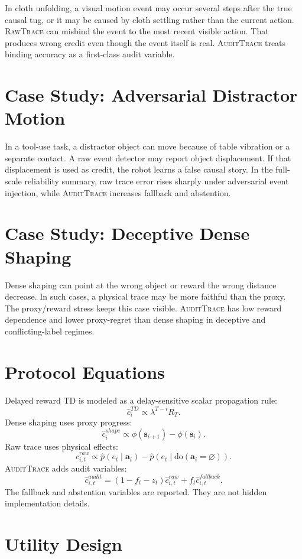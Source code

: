 \documentclass{article}
\newcommand{\method}{\textsc{AuditTrace}\xspace}
\newcommand{\rawtrace}{\textsc{RawTrace}\xspace}
\newcommand{\states}{\mathbf{s}}
\newcommand{\actions}{\mathbf{a}}
\begin{document}
In cloth unfolding, a visual motion event may occur several steps after the true causal tug, or it may be caused by cloth settling rather than the current action. \rawtrace can misbind the event to the most recent visible action. That produces wrong credit even though the event itself is real. \method treats binding accuracy as a first-class audit variable.

\section{Case Study: Adversarial Distractor Motion}

In a tool-use task, a distractor object can move because of table vibration or a separate contact. A raw event detector may report object displacement. If that displacement is used as credit, the robot learns a false causal story. In the full-scale reliability summary, raw trace error rises sharply under adversarial event injection, while \method increases fallback and abstention.

\section{Case Study: Deceptive Dense Shaping}

Dense shaping can point at the wrong object or reward the wrong distance decrease. In such cases, a physical trace may be more faithful than the proxy. The proxy/reward stress keeps this case visible. \method has low reward dependence and lower proxy-regret than dense shaping in deceptive and conflicting-label regimes.

\section{Protocol Equations}

Delayed reward TD is modeled as a delay-sensitive scalar propagation rule:
\[
    \hat{c}^{TD}_{i} \propto \lambda^{T-i} R_T.
\]
Dense shaping uses proxy progress:
\[
    \hat{c}^{shape}_{i} \propto \phi(\states_{i+1})-\phi(\states_i).
\]
Raw trace uses physical effects:
\[
    \hat{c}^{raw}_{i,t} \propto \hat{p}(e_t \mid \actions_i)-\hat{p}(e_t \mid \mathrm{do}(\actions_i=\varnothing)).
\]
\method adds audit variables:
\[
    \hat{c}^{audit}_{i,t} = (1-f_t-z_t)\hat{c}^{raw}_{i,t}+f_t\hat{c}^{fallback}_{i,t}.
\]
The fallback and abstention variables are reported. They are not hidden implementation details.

\section{Utility Design}
\end{document}
